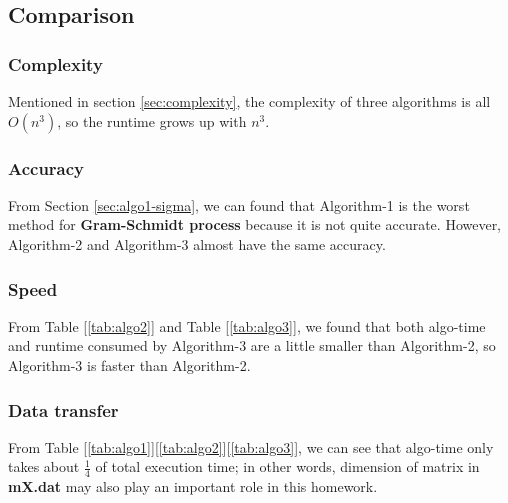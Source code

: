 \documentclass{article}
\begin{document}
\subsection{Comparison}
\subsubsection{Complexity}
Mentioned in section \ref{sec:complexity}, the complexity of three algorithms is all $O(n^3)$, so the runtime grows up with $n^3$.
\subsubsection{Accuracy}
From Section \ref{sec:algo1-sigma}, we can found that Algorithm-1 is the worst method for \textbf{Gram-Schmidt process} because it is not
quite accurate. However, Algorithm-2 and Algorithm-3 almost have the same accuracy.
\subsubsection{Speed}
From Table [\ref{tab:algo2}] and Table [\ref{tab:algo3}], we found that both algo-time and runtime consumed by Algorithm-3 are a little
smaller than Algorithm-2, so Algorithm-3 is faster than Algorithm-2.
\subsubsection{Data transfer}
From Table [\ref{tab:algo1}][\ref{tab:algo2}][\ref{tab:algo3}], we can see that algo-time only takes about $\frac{1}{4}$ of total
execution time; in other words, dimension of matrix in \textbf{mX.dat} may also play an important role in this homework.

\end{document}
